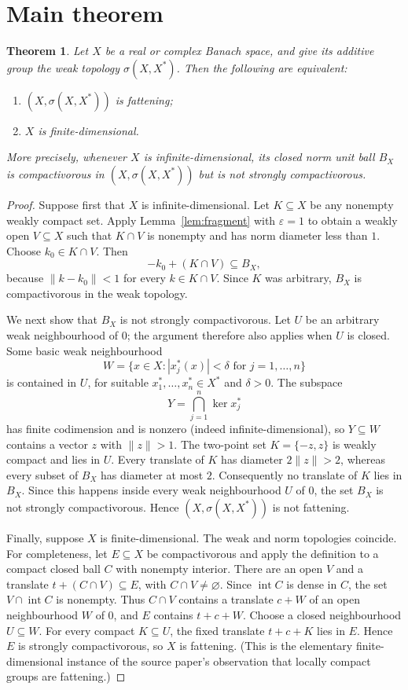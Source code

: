 \documentclass[11pt]{article}
\newtheorem{theorem}{Theorem}
\newcommand{\weak}{\sigma(X,X^*)}
\begin{document}
\section{Main theorem}

\begin{theorem}\label{thm:main}
Let $X$ be a real or complex Banach space, and give its additive group the weak
topology $\weak$.  Then the following are equivalent:
\begin{enumerate}
\item $(X,\weak)$ is fattening;
\item $X$ is finite-dimensional.
\end{enumerate}
More precisely, whenever $X$ is infinite-dimensional, its closed norm unit
ball $B_X$ is compactivorous in $(X,\weak)$ but is not strongly
compactivorous.
\end{theorem}

\begin{proof}
Suppose first that $X$ is infinite-dimensional.  Let $K\subseteq X$ be any
nonempty weakly compact set.  Apply Lemma~\ref{lem:fragment} with
$\varepsilon=1$ to obtain a weakly open $V\subseteq X$ such that
$K\cap V$ is nonempty and has norm diameter less than $1$.  Choose
$k_0\in K\cap V$.  Then
\[
 -k_0+(K\cap V)\subseteq B_X,
\]
because $\|k-k_0\|<1$ for every $k\in K\cap V$.  Since $K$ was arbitrary,
$B_X$ is compactivorous in the weak topology.

We next show that $B_X$ is not strongly compactivorous.  Let $U$ be an
arbitrary weak neighbourhood of $0$; the argument therefore also applies when
$U$ is closed.  Some basic weak neighbourhood
\[
 W=\{x\in X: |x_j^*(x)|<\delta\text{ for }j=1,\ldots,n\}
\]
is contained in $U$, for suitable $x_1^*,\ldots,x_n^*\in X^*$ and
$\delta>0$.  The subspace
\[
 Y=\bigcap_{j=1}^n\ker x_j^*
\]
has finite codimension and is nonzero (indeed infinite-dimensional), so
$Y\subseteq W$ contains a vector $z$ with $\|z\|>1$.  The two-point set
$K=\{-z,z\}$ is weakly compact and lies in $U$.  Every translate of $K$ has
diameter $2\|z\|>2$, whereas every subset of $B_X$ has diameter at most $2$.
Consequently no translate of $K$ lies in $B_X$.  Since this happens inside
every weak neighbourhood $U$ of $0$, the set $B_X$ is not strongly
compactivorous.  Hence $(X,\weak)$ is not fattening.

Finally, suppose $X$ is finite-dimensional.  The weak and norm topologies
coincide.  For completeness, let $E\subseteq X$ be compactivorous and apply
the definition to a compact closed ball $C$ with nonempty interior.  There
are an open $V$ and a translate $t+(C\cap V)\subseteq E$, with
$C\cap V\ne\varnothing$.  Since $\operatorname{int}C$ is dense in $C$, the
set $V\cap\operatorname{int}C$ is nonempty.  Thus $C\cap V$ contains a
translate $c+W$ of an open neighbourhood $W$ of $0$, and $E$ contains
$t+c+W$.  Choose a closed neighbourhood $U\subseteq W$.  For every compact
$K\subseteq U$, the fixed translate $t+c+K$ lies in $E$.  Hence $E$ is
strongly compactivorous, so $X$ is fattening.  (This is the elementary
finite-dimensional instance of the source paper's observation that locally
compact groups are fattening.)
\end{proof}
\end{document}
